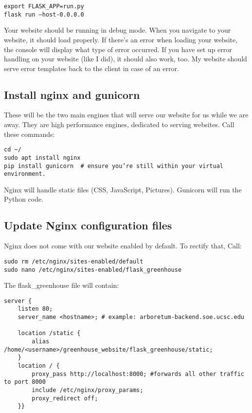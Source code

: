 \begin{verbatim}
export FLASK_APP=run.py
flask run –host-0.0.0.0
\end{verbatim}

Your website should be running in debug mode. When you navigate to your
website, it should load properly. If there's an error when loading your
website, the console will display what type of error occurred. If you
have set up error handling on your website (like I did), it should also
work, too. My website should serve error templates back to the client in
case of an error.

\subsection{Install nginx and
gunicorn}\label{install-nginx-and-gunicorn}

These will be the two main engines that will serve our website for us
while we are away. They are high performance engines, dedicated to
serving websites. Call these commands:

\begin{verbatim}
cd ~/
sudo apt install nginx
pip install gunicorn  # ensure you’re still within your virtual environment.
\end{verbatim}

Nginx will handle static files (CSS, JavaScript, Pictures). Gunicorn
will run the Python code.

\subsection{Update Nginx configuration
files}\label{update-nginx-configuration-files}

Nginx does not come with our website enabled by default. To rectify
that, Call:

\begin{verbatim}
sudo rm /etc/nginx/sites-enabled/default
sudo nano /etc/nginx/sites-enabled/flask_greenhouse
\end{verbatim}

The flask\_greenhouse file will contain:

\begin{verbatim}
server {
    listen 80;
    server_name <hostname>; # example: arboretum-backend.soe.ucsc.edu
    
    location /static {
        alias /home/<username>/greenhouse_website/flask_greenhouse/static;
    }
    location / {
        proxy_pass http://localhost:8000; #forwards all other traffic to port 8000
        include /etc/nginx/proxy_params;
        proxy_redirect off;
    }}
\end{verbatim}

